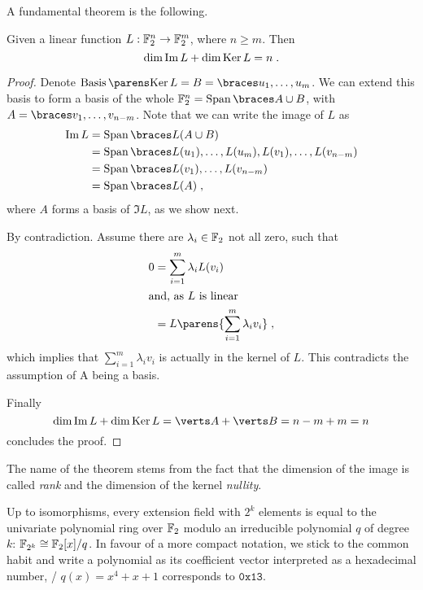 A fundamental theorem is the following.
\begin{theorem}\label{thm:rank-nullity}
    Given a linear function $L : \mathbb{F}_2^n \to \mathbb{F}_2^m$, where $n \geqslant m$.
    Then
    \begin{equation*}
        \dim{\operatorname{Im}{L}} + \dim{\operatorname{Ker}{L}} = n\;.
    \end{equation*}
\end{theorem}
\begin{proof}
    Denote $\Basis{\Ker{L}} = B = \set{u_1, \ldots, u_m}$.
    We can extend this basis to form a basis of the whole $\F_2^n = \Span{A \cup B}$, with $A = \set{v_1, \ldots, v_{n-m}}$.
    Note that we can write the image of $L$ as
    \begin{align*}
        \Im{L} &= \Span{L(A \cup B)} \\
               &= \Span{L(u_1), \ldots, L(u_m), L(v_1), \ldots, L(v_{n-m})} \\
               &= \Span{L(v_1), \ldots, L(v_{n-m})} \\
               &= \Span{L(A)}\;,
    \end{align*}
    where $A$ forms a basis of $\Im{L}$, as we show next.

    By contradiction.
    Assume there are $\lambda_i \in \mathbb{F}_2$ not all zero, such that
    \begin{align*}
        0 &= \sum_{i=1}^m \lambda_i L(v_i) \\
        \intertext{and, as $L$ is linear}
          &= L\parens{\sum_{i=1}^m \lambda_i v_i}\;,
    \end{align*}
    which implies that $\sum_{i=1}^m \lambda_i v_i$ is actually in the kernel of $L$.
    This contradicts the assumption of A being a basis.

    Finally
    \begin{equation*}
        \dim{\Im{L}} + \dim{\Ker{L}} = \abs{A} + \abs{B} = n-m + m = n
    \end{equation*}
    concludes the proof.
\end{proof}
The name of the theorem stems from the fact that the dimension of the image is called \emph{rank} and the dimension of the kernel \emph{nullity}.

Up to isomorphisms, every extension field with $2^k$ elements is equal to the univariate polynomial ring over $\mathbb{F}_2$ modulo an irreducible polynomial $q$ of degree $k$: $\mathbb{F}_{2^k} \cong \mathbb{F}_2[x]/q$.
In favour of a more compact notation, we stick to the common habit and write a polynomial as its coefficient vector interpreted as a hexadecimal number, \ie/ $q(x) = x^4 + x + 1$ corresponds to $\mathtt{0x13}$.

